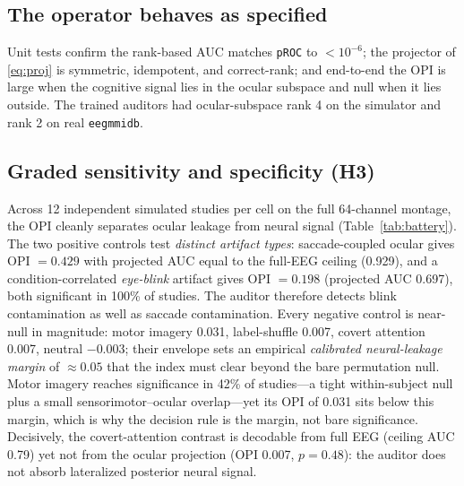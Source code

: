 \documentclass[conference]{IEEEtran}
\begin{document}
\subsection{The operator behaves as specified}

Unit tests confirm the rank-based AUC matches \texttt{pROC} to $<10^{-6}$; the projector of
\eqref{eq:proj} is symmetric, idempotent, and correct-rank; and end-to-end the OPI is large when
the cognitive signal lies in the ocular subspace and null when it lies outside. The trained
auditors had ocular-subspace rank 4 on the simulator and rank 2 on real \texttt{eegmmidb}.



\subsection{Graded sensitivity and specificity (H3)}

Across 12 independent simulated studies per cell on the full 64-channel montage, the OPI cleanly
separates ocular leakage from neural signal (Table~\ref{tab:battery}).
The two positive controls test \emph{distinct artifact types}: saccade-coupled ocular gives
OPI $=0.429$ with projected AUC equal to the full-EEG ceiling (0.929), and a condition-correlated
\emph{eye-blink} artifact gives OPI $=0.198$ (projected AUC 0.697), both significant in 100\% of
studies. The auditor therefore detects blink contamination as well as saccade contamination.
Every negative control is near-null in magnitude: motor imagery 0.031, label-shuffle 0.007,
covert attention 0.007, neutral $-0.003$; their envelope sets an empirical \emph{calibrated
neural-leakage margin} of $\approx 0.05$ that the index must clear beyond the bare permutation
null. Motor imagery reaches significance in 42\% of studies---a tight within-subject null plus a
small sensorimotor--ocular overlap---yet its OPI of 0.031 sits below this margin, which is why
the decision rule is the margin, not bare significance. Decisively, the covert-attention contrast is decodable from full EEG (ceiling AUC 0.79)
yet not from the ocular projection (OPI 0.007, $p=0.48$): the auditor does not absorb lateralized
posterior neural signal.
\end{document}
